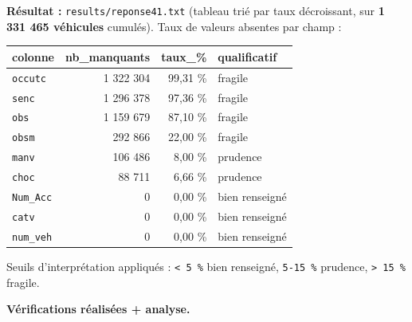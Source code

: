 \documentclass[11pt,a4paper]{article}
\newcommand{\rub}[2]{\textbf{\textcolor{#1}{#2}}}
\begin{document}
\rub{labresultat}{Résultat :} \texttt{results/reponse41.txt} (tableau trié par taux décroissant, sur \textbf{1 331 465 véhicules} cumulés). Taux de valeurs absentes par champ :

\begin{center}
\begin{tabular}{l r r l}
\hline
\textbf{colonne} & \textbf{nb\_manquants} & \textbf{taux\_\%} & \textbf{qualificatif} \\
\hline
\texttt{occutc} & 1 322 304 & 99,31 \% & fragile \\
\texttt{senc} & 1 296 378 & 97,36 \% & fragile \\
\texttt{obs} & 1 159 679 & 87,10 \% & fragile \\
\texttt{obsm} & 292 866 & 22,00 \% & fragile \\
\texttt{manv} & 106 486 & 8,00 \% & prudence \\
\texttt{choc} & 88 711 & 6,66 \% & prudence \\
\texttt{Num\_Acc} & 0 & 0,00 \% & bien renseigné \\
\texttt{catv} & 0 & 0,00 \% & bien renseigné \\
\texttt{num\_veh} & 0 & 0,00 \% & bien renseigné \\
\hline
\end{tabular}
\end{center}

Seuils d'interprétation appliqués : \texttt{< 5 \%} bien renseigné, \texttt{5-15 \%} prudence, \texttt{> 15 \%} fragile.

\rub{labanalyse}{Vérifications réalisées + analyse.}
\end{document}
